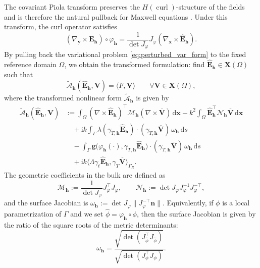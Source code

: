 \documentclass[12pt,reqno]{amsart}
\theoremstyle{definition}
\numberwithin{equation}{section}
\begin{document}
The covariant Piola transform preserves the \(H(\operatorname{curl})\)-structure
of the fields and is therefore the natural pullback for Maxwell equations
\cite[Lemma~3.58]{Monk2003}. Under this transform, the curl operator satisfies
\[
(\nabla_{\boldsymbol y}\times \mathbf E_{\mathbf h})\circ\varphi_{\mathbf h}
=
\frac{1}{\det J_{\varphi}}
J_{\varphi}
(\nabla_{\boldsymbol x}\times \widehat{\mathbf E}_{\mathbf h}).
\]
By pulling back the variational problem \eqref{eq:perturbed_var_form} to the fixed reference domain $\Omega$, we obtain the transformed formulation: find $\hat{\mathbf{E}}_{\mathbf{h}} \in \mathbf{X}(\Omega)$ such that
\begin{equation}\label{eq:pullback_problem}
\widetilde{\mathcal{A}}_{\mathbf{h}}(\hat{\mathbf{E}}_{\mathbf{h}}, \mathbf{V}) = \langle F, \mathbf{V} \rangle \qquad \forall \mathbf{V} \in \mathbf{X}(\Omega),
\end{equation}
where the transformed nonlinear form $\widetilde{\mathcal{A}}_{\mathbf{h}}$ is given by
\begin{equation}\label{eq:weak_form_pullback_impedance}
\begin{aligned}
\widetilde{\mathcal{A}}_{\mathbf{h}}(\hat{\mathbf{E}}_{\mathbf{h}}, \mathbf{V}) &:= \int_{\Omega} (\nabla \times \hat{\mathbf{E}}_{\mathbf{h}})^{\top} \mathcal{M}_{\mathbf{h}} (\nabla \times \overline{\mathbf{V}}) \,\mathrm{d}\boldsymbol{x} - k^2 \int_{\Omega} \hat{\mathbf{E}}_{\mathbf{h}}^{\top} \mathcal{N}_{\mathbf{h}} \overline{\mathbf{V}} \,\mathrm{d}\boldsymbol{x} \\
&\quad + \mathrm{i}k \int_{\Gamma} \lambda (\gamma_{T,\mathbf{h}} \hat{\mathbf{E}}_{\mathbf{h}}) \cdot (\gamma_{T,\mathbf{h}} \overline{\mathbf{V}}) \, \omega_{\mathbf{h}} \,\mathrm{d}s \\
&\quad - \int_{\Gamma} \mathbf{g} \bigl( \varphi_{\mathbf{h}}(\cdot), \gamma_{T,\mathbf{h}} \hat{\mathbf{E}}_{\mathbf{h}} \bigr) \cdot (\gamma_{T,\mathbf{h}} \overline{\mathbf{V}}) \, \omega_{\mathbf{h}} \,\mathrm{d}s \\
&\quad + \mathrm{i}k \langle \Lambda \gamma_t \hat{\mathbf{E}}_{\mathbf{h}}, \gamma_T \overline{\mathbf{V}} \rangle_{\Gamma_R}.
\end{aligned}
\end{equation}
The geometric coefficients in the bulk are defined as
\[
\mathcal{M}_{\mathbf{h}} := \frac{1}{\det J_{\varphi}} J_{\varphi}^{\top} J_{\varphi}, \qquad \mathcal{N}_{\mathbf{h}} := \det J_{\varphi} J_{\varphi}^{-1} J_{\varphi}^{-\top},
\]
and the surface Jacobian is $\omega_{\mathbf{h}} := \det J_{\varphi} \|J_{\varphi}^{-\top} \mathbf{n}\|$. Equivalently, if $\phi$ is a local parametrization of $\Gamma$ and we set $\widehat{\phi} = \varphi_{\mathbf{h}} \circ \phi$, then the surface Jacobian is given by the ratio of the square roots of the metric determinants:
\[
\omega_{\mathbf{h}} = \frac{\sqrt{\det(J_{\widehat{\phi}}^{\top} J_{\widehat{\phi}})}}{\sqrt{\det(J_{\phi}^{\top} J_{\phi})}}.
\]
\end{document}
